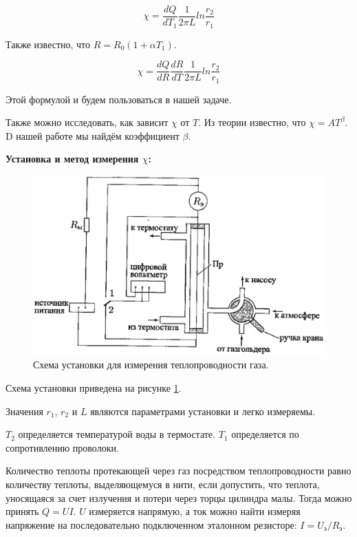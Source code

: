 \documentclass[a4paper,12pt]{article}
\begin{document}
\begin{equation} \label{eq-basic3}
\chi = \frac{dQ}{dT_1} \frac{1}{2 \pi L} ln\frac{r_2}{r_1}
\end{equation}

Также известно, что $R = R_0( 1 + \alpha T_1)$. 

\begin{equation} \label{eq-basicfinal}
\chi = \frac{dQ}{dR} \frac{dR}{dT} \frac{1}{2 \pi L} ln\frac{r_2}{r_1}
\end{equation}

Этой формулой и будем пользоваться в нашей задаче.

Также можно исследовать, как зависит $\chi$ от $T$. Из теории известно, что $\chi = AT^\beta$. D нашей работе мы найдём коэффициент $\beta$.

\bigskip

\textbf{Установка и метод измерения $\chi$:}
\bigskip

\begin{figure}[ht]
\centering
\includegraphics[width=180mm]{schema1.eps}
\caption{Схема установки для измерения теплопроводности газа.}\label{schema}
\end{figure}

Схема установки приведена на рисунке \ref{schema}. 

Значения $r_1$, $r_2$ и $L$ являются параметрами установки и легко измеряемы.  

$T_2$ определяется температурой воды в термостате. $T_1$ определяется по сопротивлению проволоки. 

Количество теплоты протекающей через газ посредством теплопроводности равно количеству теплоты, выделяющемуся в нити, если допустить, что теплота, уносящаяся за счет излучения и потери через торцы цилиндра малы. Тогда можно принять $Q = UI $. $U$ измеряется напрямую, а ток можно найти измеряя напряжение на последовательно подключенном эталонном резисторе: $I = U_\text{э} / R_\text{э} $.
\end{document}

